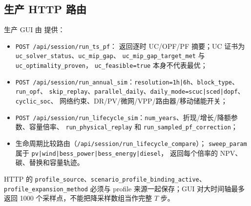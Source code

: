 \subsection{生产 HTTP 路由}
生产 GUI 由  提供：
\begin{itemize}
  \item \texttt{POST /api/session/run\_ts\_pf}：\newline
        返回逐时 UC/OPF/PF 摘要；UC 证书为
        \texttt{uc\_solver\_status}、\texttt{uc\_mip\_gap}、\newline
        \texttt{uc\_mip\_gap\_target\_met} 与 \texttt{uc\_optimality\_proven}，
        \texttt{uc\_feasible=true} 本身不代表最优；
  \item \texttt{POST /api/session/run\_annual\_sim}：\texttt{resolution=1h|6h}、\texttt{block\_type}、\texttt{run\_opf}、
        \texttt{skip\_replay}、\texttt{parallel\_daily}、\texttt{daily\_mode=scuc|sced|dopf}、\texttt{cyclic\_soc}、
        网络约束、DR/PV/微网/VPP/路由器/移动储能开关；
  \item \texttt{POST /api/session/run\_lifecycle\_sim}：\texttt{num\_years}、折现/增长/降额参数、容量倍率、
        \texttt{run\_physical\_replay} 和 \texttt{run\_sampled\_pf\_correction}；
  \item 生命周期比较路由（\texttt{/api/session/run\_lifecycle\_compare}）；
        \texttt{sweep\_param} 属于 \texttt{pv|wind|bess\_power|bess\_energy|diesel}，
        返回每个倍率的 NPV、碳、替换和容量轨迹。
\end{itemize}
HTTP 的 \texttt{profile\_source}、\texttt{scenario\_profile\_binding\_active}、\texttt{profile\_expansion\_method} 必须与
profile 来源一起保存；GUI 对大时间轴最多返回 1000 个采样点，不能把降采样数组当作完整 $T$ 步。

